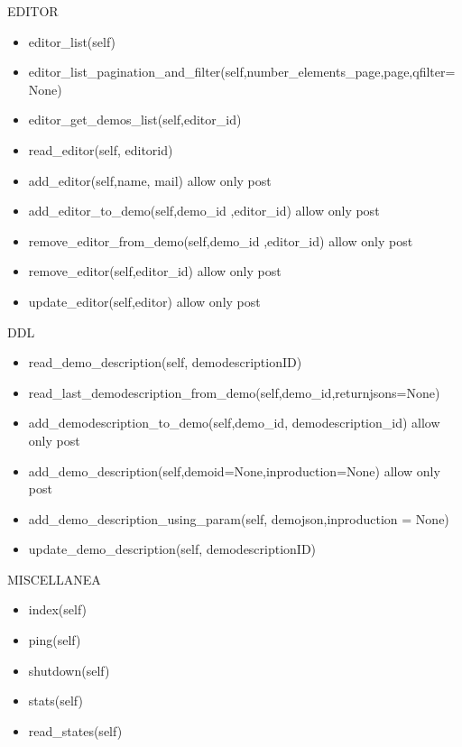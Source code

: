 EDITOR

\begin{itemize}
\item  editor\_list(self)
\item  editor\_list\_pagination\_and\_filter(self,number\_elements\_page,page,qfilter=None)
\item  editor\_get\_demos\_list(self,editor\_id)
\item  read\_editor(self, editorid)
\item  add\_editor(self,name, mail)
allow only post
\item  add\_editor\_to\_demo(self,demo\_id ,editor\_id)
allow only post
\item  remove\_editor\_from\_demo(self,demo\_id ,editor\_id)
allow only post
\item  remove\_editor(self,editor\_id)
allow only post
\item  update\_editor(self,editor)
allow only post
\end{itemize}

DDL

\begin{itemize}
\item  read\_demo\_description(self, demodescriptionID)
\item  read\_last\_demodescription\_from\_demo(self,demo\_id,returnjsons=None)
\item  add\_demodescription\_to\_demo(self,demo\_id, demodescription\_id)
allow only post
\item  add\_demo\_description(self,demoid=None,inproduction=None)
allow only post
\item  add\_demo\_description\_using\_param(self, demojson,inproduction = None)
\item  update\_demo\_description(self, demodescriptionID)
\end{itemize}

MISCELLANEA

\begin{itemize}
\item  index(self)
\item  ping(self)
\item  shutdown(self)
\item  stats(self)
\item  read\_states(self)
\end{itemize}
